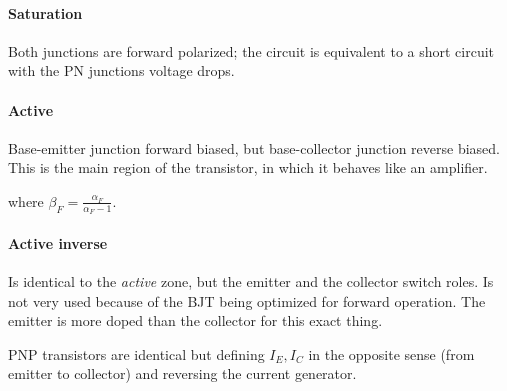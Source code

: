 \documentclass[a4paper,10pt]{article}
\newcommand{\coolsection}[1]{
  \begin{tcolorbox}
      \large\biolinum{\textsc{#1}}
  \end{tcolorbox}
}
\begin{document}
\begin{multicols}{2}
  \paragraph{Saturation}
  Both junctions are forward polarized; the circuit is equivalent to a
  short circuit with the PN junctions voltage drops.
  \begin{center}
  \end{center}

  \paragraph{Active}
  Base-emitter junction forward biased, but base-collector junction
  reverse biased. This is the main region of the transistor, in which
  it behaves like an amplifier.
  \begin{center}
  \end{center}
  where $β_{\mathit{F}}= \frac{α_{\mathit{F}}}{α_{\mathit{F}}-1}$.

\paragraph{Active inverse}
Is identical to the \emph{active} zone, but the emitter and the
collector switch roles. Is not very used because of the BJT being
optimized for forward operation.
The emitter is more doped than the collector for this exact thing.

PNP transistors are identical but defining $I_E,I_C$ in the opposite
sense (from emitter to collector) and reversing the current generator.

\coolsection{AC model}
\begin{center}
\end{center}


\end{multicols}
\end{document}
